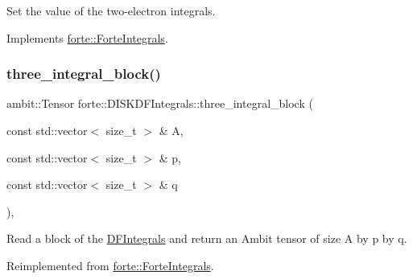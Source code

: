 Set the value of the two-\/electron integrals. 



Implements \mbox{\hyperlink{classforte_1_1_forte_integrals_aaccd56e90bbc3c423158efb154336b9c}{forte\+::\+Forte\+Integrals}}.

\mbox{\label{classforte_1_1_d_i_s_k_d_f_integrals_aa36e8484286f58bcb2b57a7c8fb08a36}} 
\subsubsection{\texorpdfstring{three\+\_\+integral\+\_\+block()}{three\_integral\_block()}}
{\footnotesize\ttfamily ambit\+::\+Tensor forte\+::\+D\+I\+S\+K\+D\+F\+Integrals\+::three\+\_\+integral\+\_\+block (\begin{DoxyParamCaption}\item[{const std\+::vector$<$ size\+\_\+t $>$ \&}]{A,  }\item[{const std\+::vector$<$ size\+\_\+t $>$ \&}]{p,  }\item[{const std\+::vector$<$ size\+\_\+t $>$ \&}]{q }\end{DoxyParamCaption})\hspace{0.3cm}{\ttfamily [override]}, {\ttfamily [virtual]}}



Read a block of the \mbox{\hyperlink{classforte_1_1_d_f_integrals}{D\+F\+Integrals}} and return an Ambit tensor of size A by p by q. 



Reimplemented from \mbox{\hyperlink{classforte_1_1_forte_integrals_aa1d259ae97b5a9c96ccb20599543b126}{forte\+::\+Forte\+Integrals}}.

\mbox{\label{classforte_1_1_d_i_s_k_d_f_integrals_a754ec30830dd51627a3608dfca9f5f4d}} 
